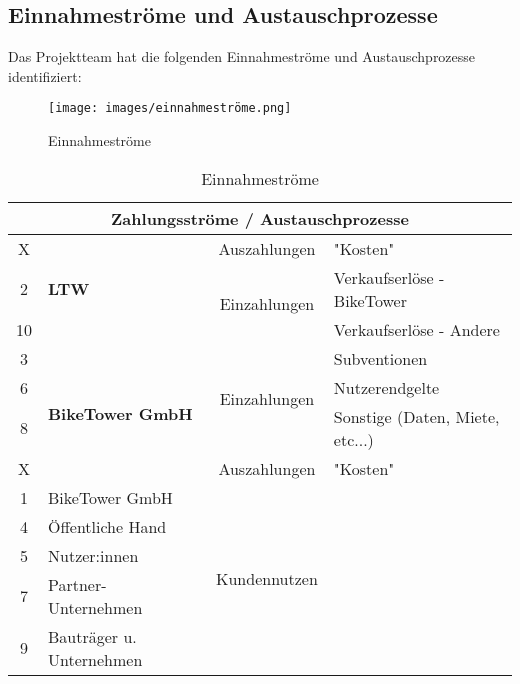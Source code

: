 \subsection{Einnahmeströme und Austauschprozesse}

Das Projektteam hat die folgenden Einnahmeströme und Austauschprozesse identifiziert:

\begin{figure}[H]
  \centering
  \texttt{[image: images/einnahmeströme.png]}
  \caption{Einnahmeströme}
  \label{fig:einnahmestroeme}
\end{figure}

\begin{table}[H]
  \centering
  \begin{tabular}{clcl}
    \multicolumn{4}{c}{\textbf{Zahlungsströme / Austauschprozesse}}                                                 \\
    \toprule
    X  & \multirow{3}{*}{\textbf{LTW}}            & Auszahlungen                  & "Kosten"                        \\
    2  &                                          & \multirow{2}{*}{Einzahlungen} & Verkaufserlöse - BikeTower      \\
    10 &                                          &                               & Verkaufserlöse - Andere         \\
    \midrule
    3  & \multirow{4}{*}{\textbf{BikeTower GmbH}} & \multirow{3}{*}{Einzahlungen} & Subventionen                    \\
    6  &                                          &                               & Nutzerendgelte                  \\
    8  &                                          &                               & Sonstige (Daten, Miete, etc...) \\
    X  &                                          & Auszahlungen                  & "Kosten"                        \\
    \midrule
    1  & BikeTower GmbH                           & \multirow{5}{*}{Kundennutzen}                                   \\
    4  & Öffentliche Hand                                                                                           \\
    5  & Nutzer:innen                                                                                               \\
    7  & Partner-Unternehmen                                                                                        \\
    9  & Bauträger u. Unternehmen                                                                                   \\
    \bottomrule
  \end{tabular}
  \caption{Einnahmeströme}
  \label{tab:einnahmestroeme}
\end{table}